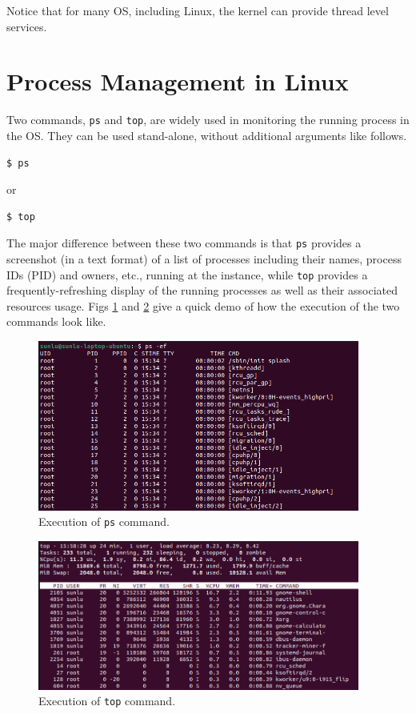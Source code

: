 Notice that for many OS, including Linux, the kernel can provide thread level services.

\section{Process Management in Linux}

Two commands, \verb|ps| and \verb|top|, are widely used in monitoring the running process in the OS. They can be used stand-alone, without additional arguments like follows.
\begin{lstlisting}
$ ps
\end{lstlisting}
or
\begin{lstlisting}
$ top
\end{lstlisting}

The major difference between these two commands is that \verb|ps| provides a screenshot (in a text format) of a list of processes including their names, process IDs (PID) and owners, etc., running at the instance, while \verb|top| provides a frequently-refreshing display of the running processes as well as their associated resources usage. Figs \ref{ch:pm:fig:pscommand} and \ref{ch:pm:fig:topcommand} give a quick demo of how the execution of the two commands look like.

\begin{figure}
	\centering
	\includegraphics[width=300pt]{chapters/ch-process-management/figures/pscommand.png}
	\caption{Execution of \texttt{ps} command.} \label{ch:pm:fig:pscommand}
\end{figure}

\begin{figure}
	\centering
	\includegraphics[width=300pt]{chapters/ch-process-management/figures/topcommand.png}
	\caption{Execution of \texttt{top} command.} \label{ch:pm:fig:topcommand}
\end{figure}

